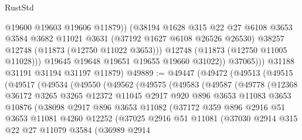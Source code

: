 \begin{lexlean}{RustStd}
\begin{coremodule}
                      @19600
                      @19603
                      @19606
                      @11879))
                  (@38194
                    @1628
                    @315
                    @22
                    @27
                    @6108
                    @3653
                    @3584
                    @3682
                    @11021
                    @3631
                    (@37192 @1627 @6108 @26526 @26530)
                    @38257
                    @12748
                    (@11873 (@12750 @11022 @3653)))
                  @12748
                  (@11873 (@12750 @11005 @11028)))
                @19645
                @19648
                @19651
                @19655
                @19660
                @31022))
            @37065)))
      @31188
      @31191
      @31194
      @31197
      @11879)
@49889 := @49447
    (@49472
      (@49513
        (@49515
          (@49517
            (@49534
              (@49550
                (@49562
                  (@49575
                    (@49583
                      (@49587
                        (@49778
                          (@12368
                            @36172
                            @3265
                            @3265
                            @12372
                            @11045
                            @2917
                            @920
                            @896
                            @3653
                            @11083
                            @3653
                            @10876
                            (@38098
                              @2917
                              @896
                              @3653
                              @11082
                              (@37172
                                @359
                                @896
                                @2916
                                @51
                                @3653
                                @11081
                                @4260
                                @12252
                                (@37025
                                  @2916
                                  @51
                                  @11081
                                  (@37030
                                    @2914
                                    @315
                                    @22
                                    @27
                                    @11079
                                    @3584
                                    (@36989
                                      @2914

\end{coremodule}
\end{lexlean}
